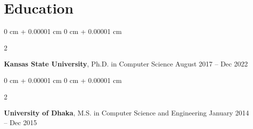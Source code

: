 \documentclass[10pt, letterpaper]{article}
\newenvironment{highlights}{
    \begin{itemize}[
        topsep=0.10 cm,
        parsep=0.10 cm,
        partopsep=0pt,
        itemsep=0pt,
        leftmargin=0 cm + 10pt
    ]
}{
    \end{itemize}
} %
\newenvironment{onecolentry}{
    \begin{adjustwidth}{
        0 cm + 0.00001 cm
    }{
        0 cm + 0.00001 cm
    }
}{
    \end{adjustwidth}
} %
\newenvironment{twocolentry}[2][]{
    \onecolentry
    \def\secondColumn{#2}
    \setcolumnwidth{\fill, 4.5 cm}
    \begin{paracol}{2}
}{
    \switchcolumn \raggedleft \secondColumn
    \end{paracol}
    \endonecolentry
} %
\begin{document}

\section{Education}
    
        \begin{twocolentry}{
            August 2017 – Dec 2022
        }
            \textbf{Kansas State University}, Ph.D. in Computer Science\end{twocolentry}


        \begin{twocolentry}{
            January 2014 – Dec 2015
        }
            \textbf{University of Dhaka}, M.S. in Computer Science and Engineering\end{twocolentry}

\end{document}
